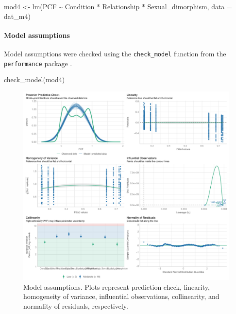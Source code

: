 \documentclass[
  bookmarksnumbered]{article}
\newenvironment{Shaded}{\begin{snugshade}}{\end{snugshade}}
\newcommand{\AttributeTok}[1]{\textcolor[rgb]{0.80,0.80,0.80}{#1}}
\newcommand{\FunctionTok}[1]{\textcolor[rgb]{0.94,0.94,0.56}{#1}}
\newcommand{\NormalTok}[1]{\textcolor[rgb]{0.80,0.80,0.80}{#1}}
\newcommand{\OtherTok}[1]{\textcolor[rgb]{0.94,0.94,0.56}{#1}}
\newcommand{\SpecialCharTok}[1]{\textcolor[rgb]{0.86,0.64,0.64}{#1}}
\begin{document}
\begin{Shaded}
\begin{Highlighting}[]
\NormalTok{mod4 }\OtherTok{\textless{}{-}} \FunctionTok{lm}\NormalTok{(PCF }\SpecialCharTok{\textasciitilde{}}\NormalTok{ Condition }\SpecialCharTok{*}\NormalTok{ Relationship }\SpecialCharTok{*}\NormalTok{ Sexual\_dimorphism,}
           \AttributeTok{data =}\NormalTok{ dat\_m4)}
\end{Highlighting}
\end{Shaded}

\paragraph{Model assumptions}\label{model-assumptions-3}

Model assumptions were checked using the \texttt{check\_model} function from the \texttt{performance} package \autocite{ludecke2021}.

\begin{Shaded}
\begin{Highlighting}[]
\FunctionTok{check\_model}\NormalTok{(mod4)}
\end{Highlighting}
\end{Shaded}

\begin{figure}
\centering
\includegraphics{Supplementary_material_files/figure-latex/assu-mod4-1.pdf}
\caption{\label{fig:assu-mod4}Model assumptions. Plots represent prediction check, linearity, homogeneity of variance, influential observations, collinearity, and normality of residuals, respectively.}
\end{figure}
\end{document}
